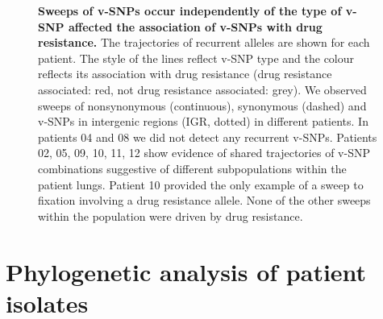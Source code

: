 \documentclass[12pt, oneside]{article}   	%
\begin{document}
\begin{figure}
\label{fig:supfig10}
\centering
{}
\caption{\textbf{Sweeps of v-SNPs occur independently of the type of v-SNP affected the association of v-SNPs with drug resistance.} The trajectories of recurrent alleles are shown for each patient. The style of the lines reflect v-SNP type and the colour reflects its association with drug resistance (drug resistance associated: red, not drug resistance associated: grey). We observed sweeps of nonsynonymous (continuous), synonymous (dashed) and v-SNPs in intergenic regions (IGR, dotted) in different patients. In patients 04 and 08 we did not detect any recurrent v-SNPs. Patients 02, 05, 09, 10, 11, 12 show evidence of shared trajectories of v-SNP combinations suggestive of different subpopulations within the patient lungs. Patient 10 provided the only example of a sweep to fixation involving a drug resistance allele. None of the other sweeps within the population were driven by drug resistance.}
\end{figure}

\newpage

\section{Phylogenetic analysis of patient isolates}
\end{document}
